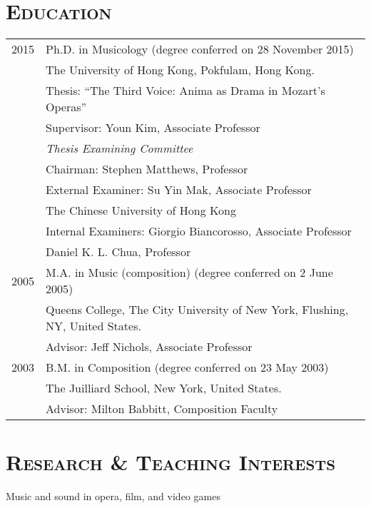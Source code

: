 \documentclass[a4paper,11pt]{article}
\begin{document}
  \section*{\textsc{Education}}
  
  \hspace*{-0.25cm}
  \begin{tabular}{p{2.5cm} l}
    2015 & Ph.D. in Musicology (degree conferred on 28 November 2015)\\
    & The University of Hong Kong, Pokfulam, Hong Kong.\\
    & Thesis: ``The Third Voice: Anima as Drama in Mozart's Operas''\\
    & Supervisor: Youn Kim, Associate Professor\\[2mm]
    & \textit{Thesis Examining Committee}\\
    & Chairman: Stephen Matthews, Professor\\
    & External Examiner: Su Yin Mak, Associate Professor\\
    & \hspace*{28.5mm} The Chinese University of Hong Kong\\
    & Internal Examiners: Giorgio Biancorosso, Associate Professor\\
    & \hspace*{29.5mm} Daniel K. L. Chua, Professor\\[2mm]
    
	2005 & M.A. in Music (composition) (degree conferred on 2 June 2005)\\
	& Queens College, The City University of New York, Flushing, NY, United States.\\
	& Advisor: Jeff Nichols, Associate Professor\\[2mm]

    2003 & B.M. in Composition (degree conferred on 23 May 2003)\\
    & The Juilliard School, New York, United States.\\
    & Advisor: Milton Babbitt, Composition Faculty
  \end{tabular}
  
  \vspace{5mm}
  
  \section*{\textsc{Research \& Teaching Interests}}
  
  \hspace{2mm} \textbullet \hspace{2mm} Music and sound in opera, film, and video games
  
\end{document}

